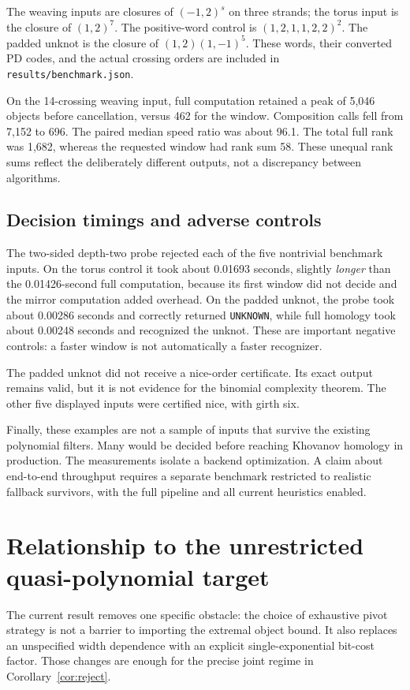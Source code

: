 \documentclass[11pt]{article}
\theoremstyle{definition}\newtheorem{definition}[theorem]{Definition}
\theoremstyle{remark}\newtheorem{remark}[theorem]{Remark}
\begin{document}
The weaving inputs are closures of $(-1,2)^s$ on three strands; the torus input is the closure of $(1,2)^7$. The positive-word control is $(1,2,1,1,2,2)^2$. The padded unknot is the closure of $(1,2)(1,-1)^5$. These words, their converted PD codes, and the actual crossing orders are included in \texttt{results/benchmark.json}.

On the 14-crossing weaving input, full computation retained a peak of 5,046 objects before cancellation, versus 462 for the window. Composition calls fell from 7,152 to 696. The paired median speed ratio was about 96.1. The total full rank was 1,682, whereas the requested window had rank sum 58. These unequal rank sums reflect the deliberately different outputs, not a discrepancy between algorithms.

\subsection{Decision timings and adverse controls}
The two-sided depth-two probe rejected each of the five nontrivial benchmark inputs. On the torus control it took about 0.01693 seconds, slightly \emph{longer} than the 0.01426-second full computation, because its first window did not decide and the mirror computation added overhead. On the padded unknot, the probe took about 0.00286 seconds and correctly returned \texttt{UNKNOWN}, while full homology took about 0.00248 seconds and recognized the unknot. These are important negative controls: a faster window is not automatically a faster recognizer.

The padded unknot did not receive a nice-order certificate. Its exact output remains valid, but it is not evidence for the binomial complexity theorem. The other five displayed inputs were certified nice, with girth six.

Finally, these examples are not a sample of inputs that survive the existing polynomial filters. Many would be decided before reaching Khovanov homology in production. The measurements isolate a backend optimization. A claim about end-to-end throughput requires a separate benchmark restricted to realistic fallback survivors, with the full pipeline and all current heuristics enabled.

\section{Relationship to the unrestricted quasi-polynomial target}
\label{sec:global}
The current result removes one specific obstacle: the choice of exhaustive pivot strategy is not a barrier to importing the extremal object bound. It also replaces an unspecified width dependence with an explicit single-exponential bit-cost factor. Those changes are enough for the precise joint regime in Corollary~\ref{cor:reject}.
\end{document}
